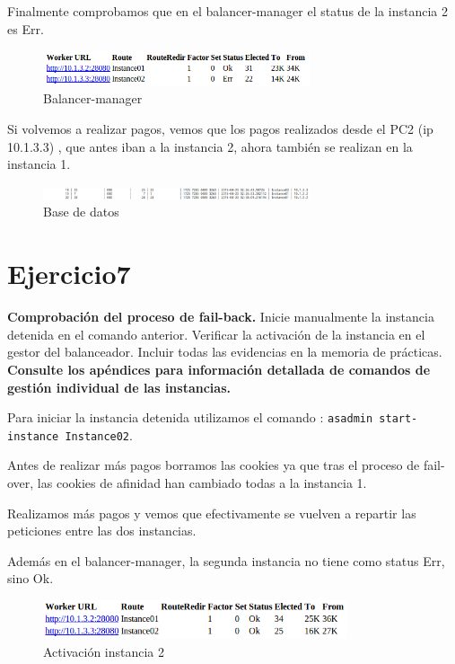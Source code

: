 \documentclass[a4paper, 10pt]{article}
\begin{document}
Finalmente comprobamos que en el balancer-manager el status de la instancia 2 es Err.

\begin{figure}[hbtp]
	\centering
	\includegraphics[width=0.7\textwidth]{../../P3/pantallazos/ej6-balancer2.png}
	\caption { Balancer-manager }
\end{figure}

Si volvemos a realizar pagos, vemos que los pagos realizados desde el PC2 (ip 10.1.3.3) , que antes iban a la instancia 2, ahora también se realizan en la instancia 1.

\begin{figure}[hbtp]
	\centering
	\includegraphics[width=0.7\textwidth]{../../P3/pantallazos/ej6-bd.png}
	\caption { Base de datos }
\end{figure}

\newpage
\section{Ejercicio7}
\begin{mdframed}
	 \textbf{Comprobación del proceso de fail-back.} Inicie manualmente la instancia detenida en el
	 comando anterior. Verificar la activación de la instancia en el gestor del balanceador. Incluir todas las
	 evidencias en la memoria de prácticas. \textbf{Consulte los apéndices para información detallada de
	 comandos de gestión individual de las instancias.}
\end{mdframed}

Para iniciar la instancia detenida utilizamos el comando : \texttt{asadmin start-instance Instance02}.

Antes de realizar más pagos borramos las cookies ya que tras el proceso de fail-over, las cookies de afinidad han cambiado todas a la instancia 1.

Realizamos más pagos y vemos que efectivamente se vuelven a repartir las peticiones entre las dos instancias.


Además en el balancer-manager, la segunda instancia no tiene como status Err, sino Ok.


\begin{figure}[hbtp]
	\centering
	\includegraphics[width=0.8\textwidth]{../../P3/pantallazos/ej7.png}
	\caption { Activación instancia 2 }
\end{figure}
\newpage
\end{document}
